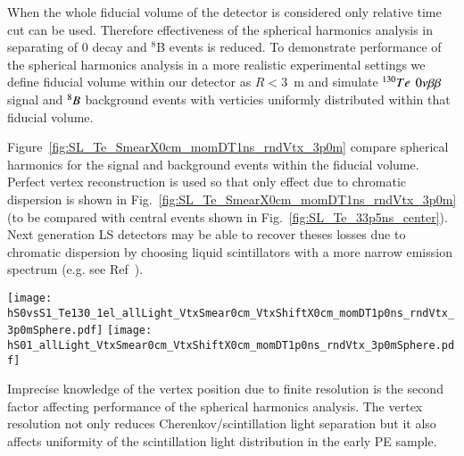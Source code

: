 When the whole fiducial volume of the detector is considered only relative time cut can be used. Therefore effectiveness of the spherical harmonics analysis in separating of 0{\nbb} decay and $^{8}$B events is reduced. To demonstrate performance of the spherical harmonics analysis in a  more realistic experimental settings we define fiducial volume within our detector as $R<3$~m and  simulate $^{130}Te$ $0\nu\beta\beta$ signal and $^{8}B$ background events with verticies uniformly distributed  within that fiducial volume.

Figure~\ref{fig:SL_Te_SmearX0cm_momDT1ns_rndVtx_3p0m} compare spherical harmonics for the signal and background events within the fiducial volume. Perfect vertex reconstruction is used so that only effect due to chromatic dispersion is shown in Fig.~\ref{fig:SL_Te_SmearX0cm_momDT1ns_rndVtx_3p0m} (to be compared with central events shown in Fig.~\ref{fig:SL_Te_33p5ns_center}). Next generation LS detectors may be able to recover theses losses due to chromatic dispersion by choosing liquid scintillators with a more narrow
emission spectrum (e.g. see Ref~\cite{LS_narrow_emission}).


\begin{figure*}[h]
  \centering
  \texttt{[image: hS0vsS1\_Te130\_1el\_allLight\_VtxSmear0cm\_VtxShiftX0cm\_momDT1p0ns\_rndVtx\_3p0mSphere.pdf]}
  \texttt{[image: hS01\_allLight\_VtxSmear0cm\_VtxShiftX0cm\_momDT1p0ns\_rndVtx\_3p0mSphere.pdf]}
  \caption{Spherical harmonics comparison between $^{130}$Te 0{\nbb}
    decay signal ($Q=2.529$~MeV) (\emph{red}) and $^{8}$B solar
    neutrinos background (\emph{blue}) for 1000 simulated
    events.Verticies are uniformly distributed within the fiducial
    volume, $R<3$~m. $^8$Be events are implemented as 2.529~MeV
    electrons with the initial momentum direction uniformly
    distributed within 4$\pi$ solid angle. Perfect vertex
    reconstruction - true vertex position is used. \emph{Left:} $S_0$
    versus $S_1$ scatter plot. Black dotted line is a linear fit of
    these 2D histograms. Variable $S_{01}$ is defined as a projection
    of 2D distribution onto this linear fit. \emph{Right:} $S_{01}$}
  \label{fig:SL_Te_SmearX0cm_momDT1ns_rndVtx_3p0m}
\end{figure*}


Imprecise knowledge of the vertex position due to finite resolution is
the second factor affecting performance of the spherical harmonics
analysis. The vertex resolution not only reduces Cherenkov/scintillation light separation but it also affects uniformity of the scintillation light distribution in the early PE sample.

